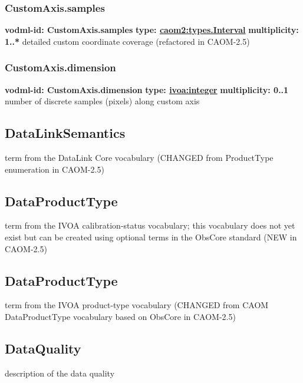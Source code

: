     \subsubsection{CustomAxis.samples}
      \textbf{vodml-id: CustomAxis.samples} \newline
      \textbf{type: \hyperref[sect:types.Interval]{caom2:types.Interval}} \newline
      \textbf{multiplicity: 1..*} \newline
      detailed custom coordinate coverage (refactored in CAOM-2.5)

    \subsubsection{CustomAxis.dimension}
      \textbf{vodml-id: CustomAxis.dimension} \newline
      \textbf{type: \hyperref[sect:ivoa]{ivoa:integer}} \newline
      \textbf{multiplicity: 0..1} \newline
      number of discrete samples (pixels) along custom axis

  \subsection{DataLinkSemantics}
  \label{sect:DataLinkSemantics}
    term from the DataLink Core vocabulary (CHANGED from ProductType enumeration in CAOM-2.5)

  \subsection{DataProductType}
  \label{sect:CalibrationStatus}
    term from the IVOA calibration-status vocabulary; this vocabulary does not yet exist but can be created using optional terms in the ObsCore standard (NEW in CAOM-2.5)

  \subsection{DataProductType}
  \label{sect:DataProductType}
    term from the IVOA product-type vocabulary (CHANGED from CAOM DataProductType vocabulary based on ObsCore in CAOM-2.5)

  \subsection{DataQuality}
  \label{sect:DataQuality}
    description of the data quality

